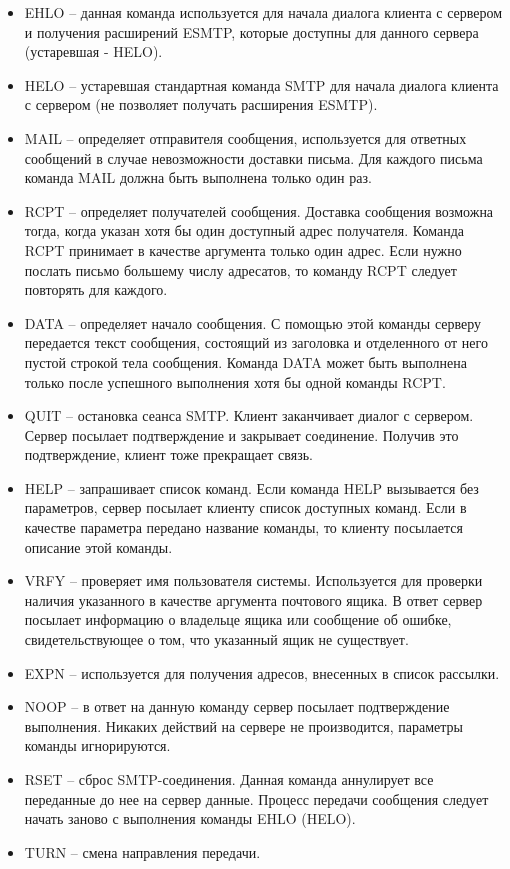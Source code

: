 \documentclass[a4paper,12pt]{report}
\begin{document}
	\begin{itemize}
		\item EHLO -- данная команда используется для начала диалога клиента с сервером и получения расширений ESMTP, которые доступны для данного сервера (устаревшая - HELO).
		\item HELO -- устаревшая стандартная команда SMTP для начала диалога клиента с сервером (не позволяет получать расширения ESMTP).
		\item MAIL -- определяет отправителя сообщения, используется для ответных сообщений в случае невозможности доставки письма. Для каждого письма команда MAIL должна быть выполнена только один раз.
		\item RCPT -- определяет получателей сообщения. Доставка сообщения возможна тогда, когда указан хотя бы один доступный адрес получателя. Команда RCPT принимает в качестве аргумента только один адрес. Если нужно послать письмо большему числу адресатов, то команду RCPT следует повторять для каждого.
		\item DATA -- определяет начало сообщения. С помощью этой команды серверу передается текст сообщения, состоящий из заголовка и отделенного от него пустой строкой тела сообщения. Команда DATA может быть выполнена только после успешного выполнения хотя бы одной команды RCPT.
		\item QUIT -- остановка сеанса SMTP. Клиент заканчивает диалог с сервером. Сервер посылает подтверждение и закрывает соединение. Получив это подтверждение, клиент тоже прекращает связь.
		\item HELP -- запрашивает список команд. Если команда HELP вызывается без параметров, сервер посылает клиенту список доступных команд. Если в качестве параметра передано название команды, то клиенту посылается описание этой команды.
		\item VRFY -- проверяет имя пользователя системы. Используется для проверки наличия указанного в качестве аргумента почтового ящика. В ответ сервер посылает информацию о владельце ящика или сообщение об ошибке, свидетельствующее о том, что указанный ящик не существует.
		\item EXPN -- используется для получения адресов, внесенных в список рассылки.
		\item NOOP -- в ответ на данную команду сервер посылает подтверждение выполнения. Никаких действий на сервере не производится, параметры команды игнорируются.
		\item RSET -- сброс SMTP-соединения. Данная команда аннулирует все переданные до нее на сервер данные. Процесс передачи сообщения следует начать заново с выполнения команды EHLO (HELO).
		\item TURN -- смена направления передачи. 
	\end{itemize}
\end{document}
